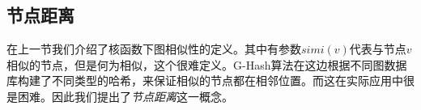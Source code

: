 \documentclass{XDBAthesis}
\begin{document}
\subsection{节点距离}
在上一节我们介绍了核函数下图相似性的定义。其中有参数$simi(v)$代表与节点$v$相似的节点，但是何为相似，这个很难定义。G-Hash算法在这边根据不同图数据库构建了不同类型的哈希，来保证相似的节点都在相邻位置。而这在实际应用中很是困难。因此我们提出了\emph{节点距离}这一概念。
\ifx\allfiles\undefined
%

\end{document}
